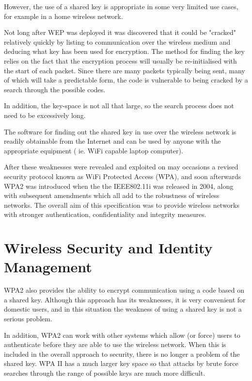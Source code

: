 However, the use of a shared key is appropriate in some very limited use cases, for example in a home wireless network.

Not long after WEP was deployed it was discovered that it could be "cracked" relatively
quickly by listing to communication over the wireless medium and deducing what key has
been used for encryption. The method for finding the key relies on the fact that the encryption process will usually be re-initialised with the start of each packet. Since there are many packets typically being sent, many of which will take a predictable form, the code is vulnerable to being cracked by a search through the possible codes. 

In addition, the key-space is not all that large, so the search process does not need to be excessively long.

The software for finding out the shared key in use over the wireless network is readily obtainable from the Internet and can be used by anyone with the appropriate equipment ( ie. WiFi capable laptop computer).

After these weaknesses were revealed and exploited on may occasions a revised security protocol known as WiFi Protected Access (WPA), and soon afterwards WPA2 was introduced when the the IEEE802.11i was released in 2004, along with subsequent amendments which all add to the robustness of wireless networks. The overall aim of this specification was to provide wireless networks with stronger authentication, confidentiality and integrity measures.


\section{Wireless Security and Identity Management}


WPA2 also provides the ability to encrypt communication using a code based on a shared
key. Although this approach has its weaknesses, it is very convenient for domestic users, and in this situation the weakness of using a shared key is not a serious problem.

In addition, WPA2 can work with other systems which allow (or force) users to authenticate before they are able to use the wireless network. When this is included in the overall approach to security, there is no longer a problem of the shared key. WPA II has a much larger key space so that attacks by brute force searches through the range of possible keys are much more difficult. 

